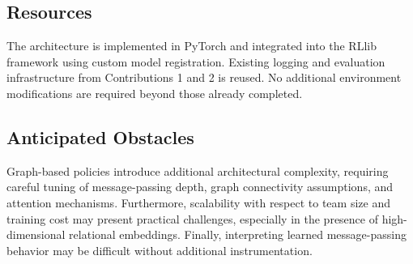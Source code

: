 \subsection{Resources}

The architecture is implemented in PyTorch and integrated into the RLlib 
framework using custom model registration. 
Existing logging and evaluation infrastructure from Contributions 1 and 2 is reused. 
No additional environment modifications are required beyond those already completed.


\subsection{Anticipated Obstacles}

Graph-based policies introduce additional architectural complexity, 
requiring careful tuning of message-passing depth, 
graph connectivity assumptions, and attention mechanisms. 
Furthermore, scalability with respect to team size and training 
cost may present practical challenges, especially in the 
presence of high-dimensional relational embeddings. 
Finally, interpreting learned message-passing behavior may be 
difficult without additional instrumentation.
